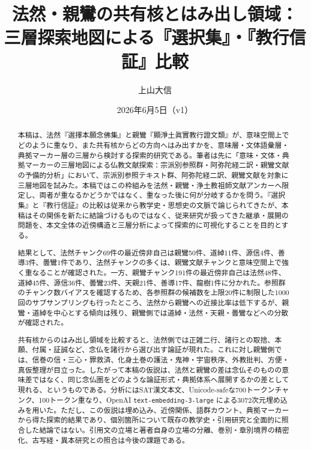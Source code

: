 \documentclass[uplatex,dvipdfmx,11pt,a4paper]{jsarticle}
\title{法然・親鸞の共有核とはみ出し領域：\\[0.35em]三層探索地図による『選択集』・『教行信証』比較}
\author{上山大信}
\date{2026年6月5日（v1）}
\begin{document}
\maketitle

\begin{abstract}
本稿は、法然『選擇本願念佛集』と親鸞『顯淨土眞實教行證文類』が、意味空間上でどのように重なり、また共有核からどの方向へはみ出すかを、意味層・文体語彙層・典拠マーカー層の三層から検討する探索的研究である。筆者は先に「意味・文体・典拠マーカーの三層地図による仏教文献探索：宗派別参照群・阿弥陀経二訳・親鸞文献の予備的分析」において、宗派別参照テキスト群、阿弥陀経二訳、親鸞文献を対象に三層地図を試みた\cite{ueyama2026three-layer-map}。本稿ではこの枠組みを法然・親鸞・浄土教祖師文献アンカーへ限定し、両者が重なるかどうかではなく、重なった後に何が分岐するかを問う。『選択集』と『教行信証』の比較は従来から教学史・思想史の文脈で論じられてきたが、本稿はその関係を新たに結論づけるものではなく、従来研究が扱ってきた継承・展開の問題を、本文全体の近傍構造と三層分析によって探索的に可視化することを目的とする。

結果として、法然チャンク69件の最近傍非自己は親鸞50件、道綽11件、源信4件、善導3件、曇鸞1件であり、法然チャンクの多くは、親鸞文献チャンクと意味空間上で強く重なることが確認された。一方、親鸞チャンク191件の最近傍非自己は法然48件、道綽45件、源信36件、曇鸞23件、天親21件、善導17件、龍樹1件に分かれた。参照群のチャンク数バイアスを確認するため、各参照群の候補数を上限20件に制限した1000回のサブサンプリングも行ったところ、法然から親鸞への近接比率は低下するが、親鸞・道綽を中心とする傾向は残り、親鸞側では道綽・法然・天親・曇鸞などへの分散が確認された。

共有核からのはみ出し領域を比較すると、法然側では正雑二行、諸行との取捨、本願、付属・証誠など、念仏を諸行から選び出す論証が現れた。これに対し親鸞側では、信巻の信・三心・罪救済、化身土巻の護法・鬼神・宇宙秩序、外教批判、方便・真仮整理が目立った。したがって本稿の仮説は、法然と親鸞の差は念仏そのものの意味差ではなく、同じ念仏圏をどのような論証形式・典拠体系へ展開するかの差として現れる、というものである。分析にはSAT漢文本文、Unicode-safeな700トークンチャンク、100トークン重なり、OpenAI \texttt{text-embedding-3-large} による3072次元埋め込みを用いた。ただし、この仮説は埋め込み、近傍関係、語群カウント、典拠マーカーから得た探索的結果であり、個別箇所について既存の教学史・引用研究と全面的に照合した結論ではない。引用文の立場と著者自身の立場の分離、巻別・章別境界の精密化、古写経・異本研究との照合は今後の課題である。
\end{abstract}
\end{document}
